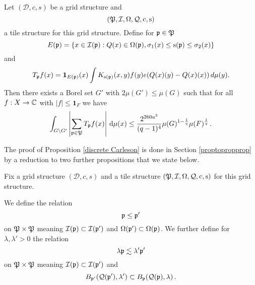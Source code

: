 \begin{prop}
\label{discrete Carleson}
Let $(\mathcal{D}, c, s)$ be a grid structure and \begin{equation*}
    (\mathfrak P,\mathcal{I},\Omega,\mathcal{Q},\mathrm{c},\mathrm{s})
\end{equation*}
a tile structure  for this grid structure.
Define for $\mathfrak p\in \mathfrak P$
\begin{equation}\label{defineep}
    E(\mathfrak p)=\{x\in \mathcal{I}(\mathfrak p): {Q}(x)\in \Omega(\mathfrak p) , {\sigma_1}(x)\le \mathrm{s}(\mathfrak p)\le {\sigma_2}(x)\}
\end{equation}
and
\begin{equation}\label{definetp}
    T_{\mathfrak p} f(x)= \mathbf{1}_{E(\mathfrak p)}(x) \int   K_{\mathrm{s}(\mathfrak p)}(x,y) f(y) e({Q}(x)(y)-{Q}(x)(x))\, d\mu(y).
\end{equation}
Then there exists a Borel set $G'$ with $2\mu(G') \leq \mu(G)$ such that for all $f:X\to \mathbb{C}$ with $|f|\le \mathbf{1}_F$
we have
\begin{equation}
    \label{disclesssim}
   \int_{G \setminus G'} \left| \sum_{\mathfrak p \in \mathfrak P} T_{\mathfrak p} f (x) \right| \, \mathrm{d}\mu(x)  \le \frac{2^{260a^3}}{(q-1)^4} \mu(G)^{1-\frac{1}{q}} \mu(F)^{\frac{1}{q}}\,.
\end{equation}
\end{prop}









The proof of Proposition \ref{discrete Carleson} is done in Section \ref{proptopropprop}
by a reduction to two further propositions that we state below.


Fix a grid structure  $(\mathcal{D}, c, s)$  and a tile structure $(\mathfrak P,\mathcal{I},\Omega,\mathcal{Q},\mathrm{c},\mathrm{s})$
for this grid structure.

We define the relation
\begin{equation}\label{straightorder}
    \mathfrak p\le \mathfrak p'
\end{equation}
 on $\mathfrak P\times \mathfrak P$ meaning
$\mathcal{I}(\mathfrak p)\subset \mathcal{I}(\mathfrak p')$ and
$\Omega(\mathfrak p')\subset \Omega(\mathfrak p)$.
We further define for $\lambda,\lambda' >0$
the relation
\begin{equation}\label{wiggleorder}
    \lambda \mathfrak p \lesssim \lambda' \mathfrak p'
\end{equation}
on $\mathfrak P\times \mathfrak P$ meaning
$\mathcal{I}(\mathfrak p)\subset \mathcal{I}(\mathfrak p')$ and
\begin{equation}
    B_{\mathfrak p'}(\mathcal{Q}(\mathfrak p'),\lambda' )
    \subset B_{\mathfrak p}(\mathcal{Q}(\mathfrak p),\lambda )\, .
\end{equation}



